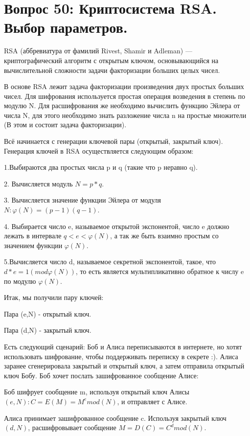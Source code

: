 
\section{Вопрос 50: Криптосистема RSA. Выбор параметров.}

\zagolovok RSA (аббревиатура от фамилий Rivest, Shamir и Adleman) — криптографический алгоритм с открытым ключом, основывающийся на вычислительной сложности задачи факторизации больших целых чисел.

В основе RSA лежит задача факторизации произведения двух простых больших чисел. Для шифрования используется простая операция возведения в степень по модулю N. Для расшифрования же необходимо вычислить функцию Эйлера от числа N, для этого необходимо знать разложение числа n на простые множители (В этом и состоит задача факторизации).

Всё начинается с генерации ключевой пары (открытый, закрытый ключ). Генерация ключей в RSA осуществляется следующим образом:

1.Выбираются два простых числа p и q (такие что p неравно q).

2. Вычисляется модуль $N=p*q$.

3. Вычисляется значение функции Эйлера от модуля $N: \varphi(N)=(p-1)(q-1)$.

4. Выбирается число e, называемое открытой экспонентой, число e должно лежать в интервале $q<e<\varphi(N)$, а так же быть взаимно простым со значением функции $\varphi(N)$.

5.Вычисляется число d, называемое секретной экспонентой, такое, что $d*e=1(mod\varphi(N))$, то есть является мультипликативно обратное к числу e по модулю $\varphi(N)$.

Итак, мы получили пару ключей:

Пара (e,N) - открытый ключ.

Пара (d,N) - закрытый ключ.


Есть следующий сценарий: Боб и Алиса переписываются в интернете, но хотят использовать шифрование, чтобы поддерживать переписку в секрете :). Алиса заранее сгенерировала закрытый и открытый ключ, а затем отправила открытый ключ Бобу. Боб хочет послать зашифрованное сообщение Алисе:

  Боб шифрует сообщение m, используя открытый ключ Алисы $(e,N) : C = E(M) = M^{e}mod(N)$, и отправляет с Алисе.

 Алиса принимает зашифрованное сообщение c. Используя закрытый ключ $(d,N)$, расшифровывает сообщение $ M = D(C) = C^{d}mod(N)$.

